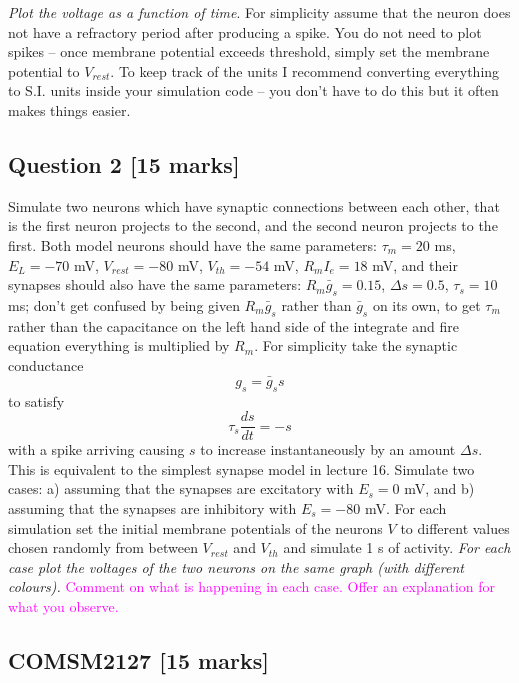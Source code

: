 \documentclass[12pt]{article}
\begin{document}
\emph{Plot the voltage as a function of time}. For simplicity assume that the
neuron does not have a refractory period after producing a spike. You
do not need to plot spikes -- once membrane potential exceeds
threshold, simply set the membrane potential to $V_{rest}$. To keep track of the units I recommend converting everything to S.I. units inside your simulation code -- you don't have to do this but it often makes things easier.

\subsection*{Question 2 [15 marks]}

Simulate two neurons which have synaptic connections between
  each other, that is the first neuron projects to the second, and the
  second neuron projects to the first. Both model neurons should have
  the same parameters: $\tau_m = 20$ ms, $E_L = -70$ mV, $V_{rest} = -80$ mV,
  $V_{th} = -54$ mV, $R_mI_e = 18$ mV, and their synapses should also have
  the same parameters: $R_m \bar{g}_s = 0.15$, $\Delta s = 0.5$, $\tau_s= 10$
  ms; don't get confused by being given $R_m\bar{g}_s$ rather than
  $\bar{g}_s$ on its own, to get $\tau_m$ rather than the capacitance
  on the left hand side of the integrate and fire equation everything
  is multiplied by $R_m$. For simplicity take the synaptic conductance
\begin{equation}
g_s=\bar{g}_s s
\end{equation}
to satisfy
\begin{equation}
\tau_s\frac{ds}{dt}=-s
\end{equation}
with a spike arriving causing $s$ to increase instantaneously by an amount $\Delta s$. This is
equivalent to the simplest synapse model in lecture 16. Simulate two
cases: a) assuming that the synapses are excitatory with $E_s = 0$ mV,
and b) assuming that the synapses are inhibitory with $E_s = -80$
mV. For each simulation set the initial membrane potentials of the
neurons $V$ to different values chosen randomly from between $V_{rest}$ and
$V_{th}$ and simulate 1 s of activity. \emph{For each case plot the voltages of
the two neurons on the same graph (with different colours).}  \textcolor{magenta}{Comment on what is happening in each case. Offer an explanation for what you observe.}

\subsection*{COMSM2127 [15 marks]}
\end{document}
